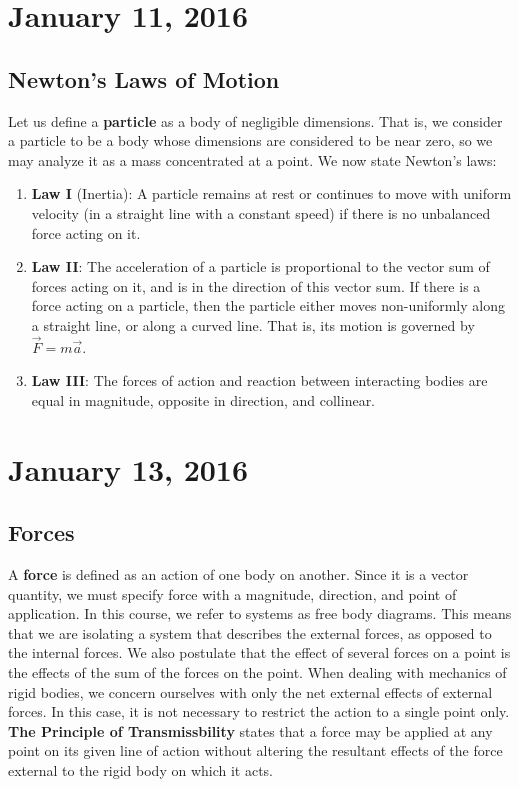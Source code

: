 \documentclass[11pt]{article}
\theoremstyle{plain} %
\theoremstyle{definition}
\theoremstyle{example}
\theoremstyle{remark}
\begin{document}
\section{January 11, 2016}


\subsection{Newton's Laws of Motion}

Let us define a \textbf{particle} as a body of negligible dimensions. That is, we consider a particle to be a body whose dimensions are considered to be near zero, so we may analyze it as a mass concentrated at a point. We now state Newton's laws:

\begin{enumerate}
	\item \textbf{Law I} (Inertia): A particle remains at rest or continues to move with uniform velocity (in a straight line with a constant speed) if there is no unbalanced force acting on it. 
	\item \textbf{Law II}: The acceleration of a particle is proportional to the vector sum of forces acting on it, and is in the direction of this vector sum. If there is a force acting on a particle, then the particle either moves non-uniformly along a straight line, or along a curved line. That is, its motion is governed by $\vec{F} = m\vec{a}$.
	\item \textbf{Law III}: The forces of action and reaction between interacting bodies are equal in magnitude, opposite in direction, and collinear. 
\end{enumerate}

\section{January 13, 2016}
\subsection{Forces}

A \textbf{force} is defined as an action of one body on another. Since it is a vector quantity, we must specify force with a magnitude, direction, and point of application. In this course, we refer to systems as free body diagrams. This means that we are isolating a system that describes the external forces, as opposed to the internal forces. We also postulate that the effect of several forces on a point is the effects of the sum of the forces on the point. When dealing with mechanics of rigid bodies, we concern ourselves with only the net external effects of external forces. In this case, it is not necessary to restrict the action to a single point only. \textbf{The Principle of Transmissbility} states that a force may be applied at any point on its given line of action without altering the resultant effects of the force external to the rigid body on which it acts.
\end{document}

